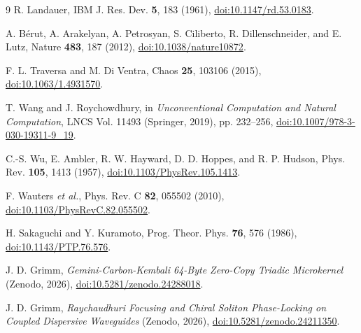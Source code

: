 \documentclass[aps,pra,twocolumn,superscriptaddress,nofootinbib,10pt]{revtex4-2}
\begin{document}
\begin{thebibliography}{9}
R. Landauer, IBM J. Res. Dev. \textbf{5}, 183 (1961),
\href{https://doi.org/10.1147/rd.53.0183}{doi:10.1147/rd.53.0183}.

A. B\'{e}rut, A. Arakelyan, A. Petrosyan, S. Ciliberto, R. Dillenschneider,
and E. Lutz, Nature \textbf{483}, 187 (2012),
\href{https://doi.org/10.1038/nature10872}{doi:10.1038/nature10872}.

F. L. Traversa and M. Di Ventra, Chaos \textbf{25}, 103106 (2015),
\href{https://doi.org/10.1063/1.4931570}{doi:10.1063/1.4931570}.

T. Wang and J. Roychowdhury, in \textit{Unconventional Computation and Natural
Computation}, LNCS Vol. 11493 (Springer, 2019), pp. 232--256,
\href{https://doi.org/10.1007/978-3-030-19311-9_19}{doi:10.1007/978-3-030-19311-9\_19}.

C.-S. Wu, E. Ambler, R. W. Hayward, D. D. Hoppes, and R. P. Hudson,
Phys. Rev. \textbf{105}, 1413 (1957),
\href{https://doi.org/10.1103/PhysRev.105.1413}{doi:10.1103/PhysRev.105.1413}.

F. Wauters \textit{et al.}, Phys. Rev. C \textbf{82}, 055502 (2010),
\href{https://doi.org/10.1103/PhysRevC.82.055502}{doi:10.1103/PhysRevC.82.055502}.

H. Sakaguchi and Y. Kuramoto, Prog. Theor. Phys. \textbf{76}, 576 (1986),
\href{https://doi.org/10.1143/PTP.76.576}{doi:10.1143/PTP.76.576}.

J. D. Grimm, \textit{Gemini-Carbon-Kembali 64-Byte Zero-Copy Triadic
Microkernel} (Zenodo, 2026),
\href{https://doi.org/10.5281/zenodo.24288018}{doi:10.5281/zenodo.24288018}.

J. D. Grimm, \textit{Raychaudhuri Focusing and Chiral Soliton Phase-Locking on
Coupled Dispersive Waveguides} (Zenodo, 2026),
\href{https://doi.org/10.5281/zenodo.24211350}{doi:10.5281/zenodo.24211350}.
\end{thebibliography}
\end{document}
